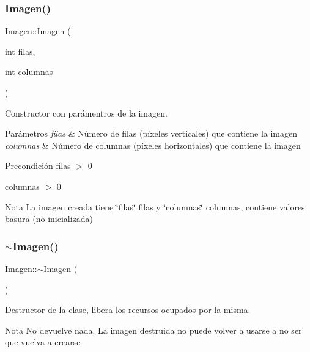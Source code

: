 \subsubsection{\texorpdfstring{Imagen()}{Imagen()}\hspace{0.1cm}{\footnotesize\ttfamily [3/3]}}
{\footnotesize\ttfamily Imagen\+::\+Imagen (\begin{DoxyParamCaption}\item[{int}]{filas,  }\item[{int}]{columnas }\end{DoxyParamCaption})}



Constructor con parámentros de la imagen. 


\begin{DoxyParams}{Parámetros}
{\em filas} & Número de filas (píxeles verticales) que contiene la imagen \\
\hline
{\em columnas} & Número de columnas (píxeles horizontales) que contiene la imagen \\
\hline
\end{DoxyParams}
\begin{DoxyPrecond}{Precondición}
filas $>$ 0 

columnas $>$ 0 
\end{DoxyPrecond}
\begin{DoxyNote}{Nota}
La imagen creada tiene \char`\"{}filas\char`\"{} filas y \char`\"{}columnas\char`\"{} columnas, contiene valores basura (no inicializada) 
\end{DoxyNote}
\mbox{\label{classImagen_a03dd93c9cf920a9dc0b72f8bd34f2e8a}} 
\subsubsection{\texorpdfstring{$\sim$\+Imagen()}{~Imagen()}}
{\footnotesize\ttfamily Imagen\+::$\sim$\+Imagen (\begin{DoxyParamCaption}{ }\end{DoxyParamCaption})}



Destructor de la clase, libera los recursos ocupados por la misma. 

\begin{DoxyNote}{Nota}
No devuelve nada. La imagen destruida no puede volver a usarse a no ser que vuelva a crearse 
\end{DoxyNote}


